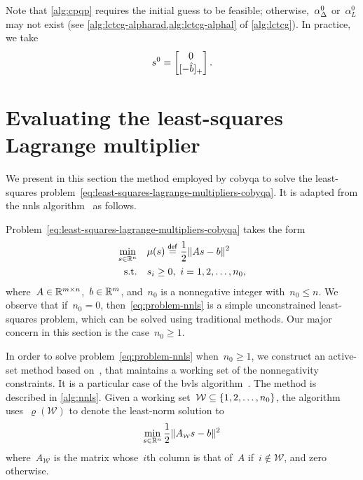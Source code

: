 Note that \cref{alg:cpqp} requires the initial guess to be feasible; otherwise,~$\alpha_{\rad}^0$ or~$\alpha_L^0$ may not exist (see \cref{alg:lctcg-alpharad,alg:lctcg-alphal} of \cref{alg:lctcg}).
In practice, we take
\begin{equation*}
    \sstep[0] =
    \begin{bmatrix}
        0\\
        \posp{-\hat{b}}
    \end{bmatrix}.
\end{equation*}

\section{Evaluating the least-squares Lagrange multiplier}
\label{sec:cobyqa-lagrange-multipliers}

We present in this section the method employed by \gls{cobyqa} to solve the least-squares problem~\cref{eq:least-squares-lagrange-multipliers-cobyqa}.
It is adapted from the \gls{nnls} algorithm~\cite[Alg.~23.10]{Lawson_Hanson_1987} as follows.

Problem~\cref{eq:least-squares-lagrange-multipliers-cobyqa} takes the form
\begin{subequations}
    \label{eq:problem-nnls}
    \begin{align}
        \min_{\sstep \in \R^n}  & \quad \mu(\sstep) \eqdef \frac{1}{2} \norm{A \sstep - b}^2\\
        \text{s.t.}             & \quad \sstep_i \ge 0, ~ i = 1, 2, \dots, n_0,
    \end{align}
\end{subequations}
where~$A \in \mathbb{R}^{m \times n}$,~$b \in \mathbb{R}^m$, and~$n_0$ is a nonnegative integer with~$n_0 \le n$.
We observe that if~$n_0 = 0$, then~\cref{eq:problem-nnls} is a simple unconstrained least-squares problem, which can be solved using traditional methods.
Our major concern in this section is the case~$n_0 \ge 1$.

In order to solve problem~\cref{eq:problem-nnls} when~$n_0 \ge 1$, we construct an active-set method based on~\cite[Alg.~23.10]{Lawson_Hanson_1987}, that maintains a working set of the nonnegativity constraints.
It is a particular case of the \gls{bvls} algorithm~\cite{Stark_Parker_1995}.
The method is described in \cref{alg:nnls}.
Given a working set~$\mathcal{W} \subseteq \{1, 2, \dots, n_0\}$, the algorithm uses~$\varrho(\mathcal{W})$ to denote the least-norm solution to
\begin{equation*}
    \min_{\sstep \in \R^n} \frac{1}{2} \norm{A_{\scriptscriptstyle \mathcal{W}} \sstep - b}^2
\end{equation*}
where~$A_{\scriptscriptstyle \mathcal{W}}$ is the matrix whose~$i$th column is that of~$A$ if~$i \notin \mathcal{W}$, and zero otherwise.

